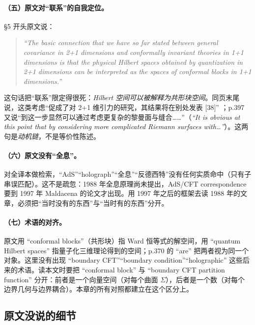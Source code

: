 \paragraph{（五）原文对“联系”的自我定位。}
\S5 开头原文说：
\begin{quote}
\emph{“The basic connection that we have so far stated between general covariance in 2+1 dimensions and conformally invariant theories in 1+1 dimensions is that the physical Hilbert spaces obtained by quantization in 2+1 dimensions can be interpreted as the spaces of conformal blocks in 1+1 dimensions.”}
\end{quote}
 这句话把“联系”限定得很死：\emph{Hilbert 空间可以被解释为共形块空间}。同页末尾说，这类考虑“促成了对 2+1 维引力的研究，其结果将在别处发表 [38]” ；p.397 又说“到这一步显然可以通过考虑更复杂的黎曼面与缝合……”（\emph{“It is obvious at this point that by considering more complicated Riemann surfaces with\dots”}）。这两句是\emph{动机链}，不是等价性陈述。

\paragraph{（六）原文没有“全息”。}
对全译本做检索，“AdS”“holograph”“全息”“反德西特”没有任何实质命中（只有子串误匹配）。这不是疏忽：1988 年全息原理尚未提出，AdS/CFT  correspondence 要到 1997 年 Maldacena 的论文才出现。用 1997 年之后的框架去读 1988 年的文章，必须把“当时没有的东西”与“当时有的东西”分开。

\paragraph{（七）术语的对齐。}
原文用 “conformal blocks”（共形块）指 Ward 恒等式的解空间，用 “quantum Hilbert spaces” 指量子化三维理论得到的空间；p.370 的 “are” 把两者视为同一个对象。这里没有出现 “boundary CFT”“boundary condition”“holographic” 这些后来的术语。读本文时要把 “conformal block” 与 “boundary CFT partition function” 分开：前者是一个向量空间（对每个曲面 $\Sigma$），后者是一个数（对每个边界几何与边界耦合）。本章的所有对照都建立在这个区分上。

\subsection{原文没说的细节}

